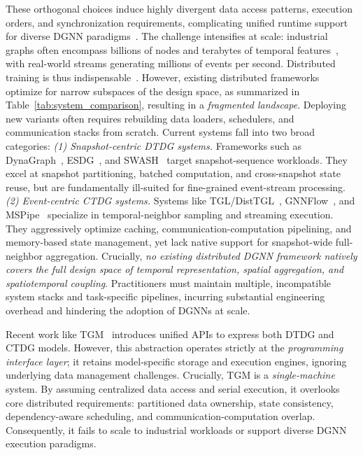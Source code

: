 These orthogonal choices induce highly divergent data access patterns, execution orders, and synchronization requirements, complicating unified runtime support for diverse DGNN paradigms~\cite{mult_paradigm1}. 
The challenge intensifies at scale: industrial graphs often encompass billions of nodes and terabytes of temporal features~\cite{zhou2023disttgl,sheng2024mspipe}, with real-world streams generating millions of events per second. 
Distributed training is thus indispensable~\cite{huangflaredtdg,zhou2023disttgl}.
%
However, existing distributed frameworks optimize for narrow subspaces of the design space, as summarized in Table~\ref{tab:system_comparison}, resulting in a \emph{fragmented landscape}. 
Deploying new variants often requires rebuilding data loaders, schedulers, and communication stacks from scratch. 
%
Current systems fall into two broad categories: 
\emph{(1) Snapshot-centric DTDG systems.}
Frameworks such as DynaGraph~\cite{guan2022dynagraph}, ESDG~\cite{chakaravarthy2021efficient}, and SWASH~\cite{song2025swash} target snapshot-sequence workloads. 
They excel at snapshot partitioning, batched computation, and cross-snapshot state reuse, but are fundamentally ill-suited for fine-grained event-stream processing.
%
\emph{(2) Event-centric CTDG systems.}
Systems like TGL/DistTGL~\cite{zhou2022tgl,zhou2023disttgl}, GNNFlow~\cite{zhong2023gnnflow}, and MSPipe~\cite{sheng2024mspipe} specialize in temporal-neighbor sampling and streaming execution.
They aggressively optimize caching, communication-computation pipelining, and memory-based state management, yet lack native support for snapshot-wide full-neighbor aggregation.
%
Crucially, \emph{no existing distributed DGNN framework natively covers the full design space of temporal representation, spatial aggregation, and spatiotemporal coupling}.
Practitioners must maintain multiple, incompatible system stacks and task-specific pipelines, incurring substantial engineering overhead and hindering the adoption of DGNNs at scale.



Recent work like TGM~\cite{chmura2025tgm} introduces unified APIs to express both DTDG and CTDG models. 
However, this abstraction operates strictly at the \emph{programming interface layer}; it retains model-specific storage and execution engines, ignoring underlying data management challenges. 
Crucially, TGM is a \emph{single-machine} system. 
By assuming centralized data access and serial execution, it overlooks core distributed requirements: partitioned data ownership, state consistency, dependency-aware scheduling, and communication-computation overlap. 
Consequently, it fails to scale to industrial workloads or support diverse DGNN execution paradigms.

